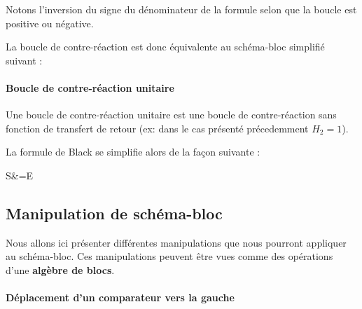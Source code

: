 Notons l'inversion du signe du dénominateur de la formule 
selon que la boucle est positive ou négative.

La boucle de contre-réaction est donc équivalente au schéma-bloc simplifié suivant :
\begin{center}
\end{center}


\paragraph{Boucle de contre-réaction unitaire}

Une boucle de contre-réaction unitaire est une boucle de contre-réaction sans 
fonction de transfert de retour (ex: dans le cas présenté précedemment $H_2=1$).

\begin{center}
\end{center}

La formule de Black se simplifie alors de la façon suivante :
\begin{bequation}
    S&=E
\end{bequation}

\subsection{Manipulation de schéma-bloc}
Nous allons ici présenter différentes manipulations que nous
pourront appliquer au schéma-bloc. Ces manipulations peuvent
être vues comme des opérations d'une \textbf{algèbre de blocs}.

\paragraph{Déplacement d'un comparateur vers la gauche}

